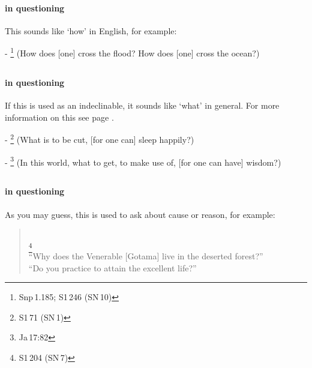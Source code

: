 \paragraph*{ in questioning} This sounds like `how' in English, for example:\par
- \footnote{Snp\,1.185; S1\,246 (SN\,10)} (How does [one] cross the flood? How does [one] cross the ocean?) \par

\subsection*{}\label{nip:kidm}\label{nip:kidmsu}
\paragraph*{ in questioning} If this is used as an indeclinable, it sounds like `what' in general. For more information on this see page \pageref{par:kim}.\par
- \footnote{S1\,71 (SN\,1)} (What is to be cut, [for one can] sleep happily?) \par
- \footnote{Ja\,17:82} (In this world, what to get, to make use of, [for one can have] wisdom?) \par

\subsection*{}\label{nip:kasmaa}
\paragraph*{ in questioning} As you may guess, this is used to ask about cause or reason, for example:\par
\begin{quote}
\\
\footnote{S1\,204 (SN\,7)}\\[1.5mm]
``Why does the Venerable [Gotama] live in the deserted forest?''\\
``Do you practice to attain the excellent life?'' \par
\end{quote}

